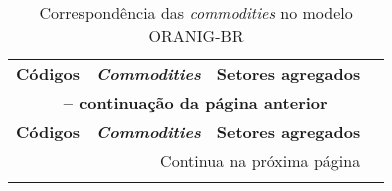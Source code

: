 \begin{apendicesenv}
	\newpage

	\begin{small}
		\begin{center}
			\begin{longtable}{lccc}
				\caption{Correspondência das \textit{commodities} no modelo ORANIG-BR}\label{ap:commodities} \\
				
				\hline
				\multirow{2}{*}{\textbf{Códigos}} & \multirow{2}{*}{\textbf{\textit{Commodities}}} & \multirow{2}{*}{\textbf{Setores agregados}} \\
				&  &  \\ \hline \endfirsthead

				\multicolumn{3}{c}{{\bfseries \tablename\ \thetable{} -- continuação da página anterior}} \\
				\hline
				\multirow{2}{*}{\textbf{Códigos}} & \multirow{2}{*}{\textbf{\textit{Commodities}}} & \multirow{2}{*}{\textbf{Setores agregados}} \\
				&  &  \\ \hline \endhead

				\hline \multicolumn{3}{r}{{Continua na próxima página}} \\ \hline
				\endfoot

				\hline \endlastfoot


\end{longtable}
\end{center}
\end{small}
\end{apendicesenv}
